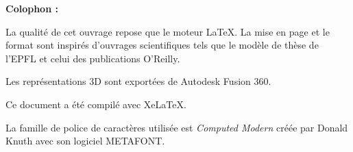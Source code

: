 \clearpage
\Large\textbf{Colophon :}\par\normalsize
\thispagestyle{empty}
La qualité de cet ouvrage repose que le moteur \LaTeX. La mise en page et le format sont inspirés d'ouvrages scientifiques tels que le modèle de thèse de l'EPFL et celui des publications O'Reilly.

Les représentations 3D sont exportées de Autodesk Fusion 360.



Ce document a été compilé avec XeLaTeX.

La famille de police de caractères utilisée est \emph{Computed Modern} créée par Donald Knuth avec son logiciel METAFONT.
\vfil
